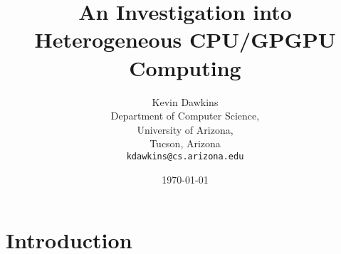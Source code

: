 \documentclass[12pt,notitlepage]{report}
\begin{document}
\title{An Investigation into Heterogeneous CPU/GPGPU Computing}
\author{Kevin Dawkins\\
  Department of Computer Science,\\
  University of Arizona,\\
  Tucson, Arizona\\
  \texttt{kdawkins@cs.arizona.edu}}
\date{\today}
\maketitle



\tableofcontents

\chapter*{Introduction}

\end{document}
